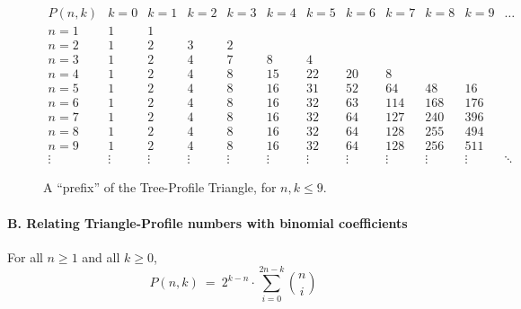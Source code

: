 \begin{figure}[htb]
\[
\begin{array}{c||r|r|r|r|r|r|r|r|r|r|r}
P(n, k) & k=0 & k=1 & k=2 & k=3 & k=4 & k=5 & k=6 & k=7 & k=8 & k=9 & \ldots \\
\hline
\hline
n=1 &  1 &  1 &    &    &     &     &     &     &     &     \\
\hline
n=2 &  1 &  2 &  3 &  2 &     &     &     &     &     &     \\
\hline
n=3 &  1 &  2 &  4 &  7 &   8 &   4 &     &     &     &     \\
\hline
n=4 &  1 &  2 &  4 &  8 &  15 &  22 &  20 &   8 &     &     \\
\hline
n=5 &  1 &  2 &  4 &  8 &  16 &  31 &  52 &  64 & 48  &  16 \\
\hline
n=6 &  1 &  2 &  4 &  8 &  16 &  32 &  63 & 114 & 168 & 176 \\
\hline
n=7 &  1 &  2 &  4 &  8 &  16 &  32 &  64 & 127 & 240 & 396 \\
\hline
n=8 &  1 &  2 &  4 &  8 &  16 &  32 &  64 & 128 & 255 & 494 \\
\hline
n=9 &  1 &  2 &  4 &  8 &  16 &  32 &  64 & 128 & 256 & 511 \\
\hline
\vdots &\vdots &\vdots &\vdots &\vdots &\vdots &\vdots &\vdots &\vdots
&\vdots &\vdots &\ddots
\end{array}
\] 
\caption{A ``prefix'' of the Tree-Profile Triangle, for $n,k \leq 9$.}
\label{fig:TP-triangle}
\end{figure}


\paragraph{\small\sf B. Relating Triangle-Profile numbers with binomial coefficients}

\begin{prop}
\label{thm:TP=sum-of-bincoeff}
For all $n \geq 1$ and all $k \geq 0$,
\begin{equation}
\label{eq:TP=sum-of-bincoeff}
P(n,k) \ = \ 2^{k-n} \cdot \sum_{i=0}^{2n-k} {n \choose i}
\end{equation}
\end{prop}

